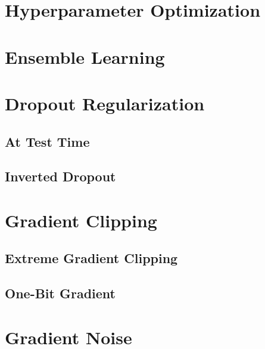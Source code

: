 	\section{Hyperparameter Optimization} %

	\section{Ensemble Learning} %

	\section{Dropout Regularization} %

		\subsection{At Test Time} %

		\subsection{Inverted Dropout} %

	\section{Gradient Clipping} %

		\subsection{Extreme Gradient Clipping} %

		\subsection{One-Bit Gradient} %

	\section{Gradient Noise} %

